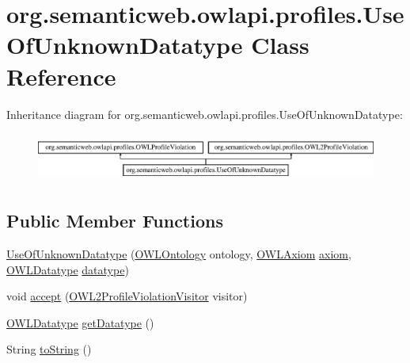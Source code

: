\hypertarget{classorg_1_1semanticweb_1_1owlapi_1_1profiles_1_1_use_of_unknown_datatype}{\section{org.\-semanticweb.\-owlapi.\-profiles.\-Use\-Of\-Unknown\-Datatype Class Reference}
\label{classorg_1_1semanticweb_1_1owlapi_1_1profiles_1_1_use_of_unknown_datatype}
}
Inheritance diagram for org.\-semanticweb.\-owlapi.\-profiles.\-Use\-Of\-Unknown\-Datatype\-:\begin{figure}[H]
\begin{center}
\leavevmode
\includegraphics[height=1.642229cm]{classorg_1_1semanticweb_1_1owlapi_1_1profiles_1_1_use_of_unknown_datatype}
\end{center}
\end{figure}
\subsection*{Public Member Functions}
\begin{DoxyCompactItemize}
\item 
\hyperlink{classorg_1_1semanticweb_1_1owlapi_1_1profiles_1_1_use_of_unknown_datatype_ac4dc0368b84fa74acc6d95efaf840a6f}{Use\-Of\-Unknown\-Datatype} (\hyperlink{interfaceorg_1_1semanticweb_1_1owlapi_1_1model_1_1_o_w_l_ontology}{O\-W\-L\-Ontology} ontology, \hyperlink{interfaceorg_1_1semanticweb_1_1owlapi_1_1model_1_1_o_w_l_axiom}{O\-W\-L\-Axiom} \hyperlink{classorg_1_1semanticweb_1_1owlapi_1_1profiles_1_1_o_w_l_profile_violation_aa7c8e8910ed3966f64a2c003fb516214}{axiom}, \hyperlink{interfaceorg_1_1semanticweb_1_1owlapi_1_1model_1_1_o_w_l_datatype}{O\-W\-L\-Datatype} \hyperlink{classorg_1_1semanticweb_1_1owlapi_1_1profiles_1_1_use_of_unknown_datatype_ac018c7961a22e4c9653c599c69e51169}{datatype})
\item 
void \hyperlink{classorg_1_1semanticweb_1_1owlapi_1_1profiles_1_1_use_of_unknown_datatype_aa2c5a1efe0d417fd889ff2b7992880ac}{accept} (\hyperlink{interfaceorg_1_1semanticweb_1_1owlapi_1_1profiles_1_1_o_w_l2_profile_violation_visitor}{O\-W\-L2\-Profile\-Violation\-Visitor} visitor)
\item 
\hyperlink{interfaceorg_1_1semanticweb_1_1owlapi_1_1model_1_1_o_w_l_datatype}{O\-W\-L\-Datatype} \hyperlink{classorg_1_1semanticweb_1_1owlapi_1_1profiles_1_1_use_of_unknown_datatype_a068828a57caad955c4041fcc28349f2d}{get\-Datatype} ()
\item 
String \hyperlink{classorg_1_1semanticweb_1_1owlapi_1_1profiles_1_1_use_of_unknown_datatype_ac5c71bb4c2735090b285a402c226bb0c}{to\-String} ()
\end{DoxyCompactItemize}
